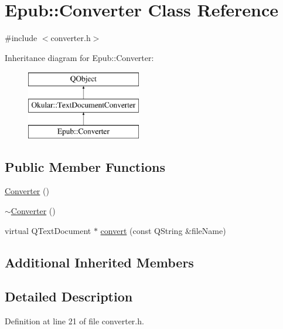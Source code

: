 \hypertarget{classEpub_1_1Converter}{\section{Epub\+:\+:Converter Class Reference}
\label{classEpub_1_1Converter}
}


{\ttfamily \#include $<$converter.\+h$>$}

Inheritance diagram for Epub\+:\+:Converter\+:\begin{figure}[H]
\begin{center}
\leavevmode
\includegraphics[height=3.000000cm]{classEpub_1_1Converter}
\end{center}
\end{figure}
\subsection*{Public Member Functions}
\begin{DoxyCompactItemize}
\item 
\hyperlink{classEpub_1_1Converter_a1de81f3e06093411e5d27ce882bc010f}{Converter} ()
\item 
\hyperlink{classEpub_1_1Converter_a9ecd05695a52c03158b81e544e13b996}{$\sim$\+Converter} ()
\item 
virtual Q\+Text\+Document $\ast$ \hyperlink{classEpub_1_1Converter_aa63e543977130604de659a4d725ee8bd}{convert} (const Q\+String \&file\+Name)
\end{DoxyCompactItemize}
\subsection*{Additional Inherited Members}


\subsection{Detailed Description}


Definition at line 21 of file converter.\+h.



